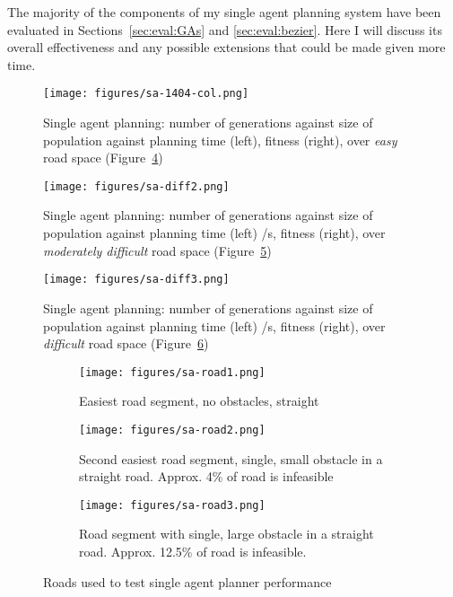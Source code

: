 The majority of the components of my single agent planning system have been evaluated in Sections~\ref{sec:eval:GAs} and \ref{sec:eval:bezier}. Here I will discuss its overall effectiveness and any possible extensions that could be made given more time.


\begin{figure}[ht]
  \centering
  \texttt{[image: figures/sa-1404-col.png]}
  \caption{\label{fig:sa-col} Single agent planning: number of generations against size of population against planning time (left), fitness (right), over \textit{easy} road space (Figure~\ref{subfig:sa-road1}) }
\end{figure}

\begin{figure}[ht]
  \centering
  \texttt{[image: figures/sa-diff2.png]}
  \caption{\label{fig:sa-diff2} Single agent planning: number of generations against size of population against planning time (left) /s, fitness (right), over \textit{moderately difficult} road space (Figure~\ref{subfig:sa-road2}) }
\end{figure}

\begin{figure}[ht]
  \centering
  \texttt{[image: figures/sa-diff3.png]}
  \caption{\label{fig:sa-diff3} Single agent planning: number of generations against size of population against planning time (left) /s, fitness (right), over \textit{difficult} road space (Figure~\ref{subfig:sa-road3}) }
\end{figure}

\begin{figure}
  \centering
  \begin{subfigure}[b]{0.44\textwidth}
    \centering
    \texttt{[image: figures/sa-road1.png]}
    \caption{\label{subfig:sa-road1}Easiest road segment, no obstacles, straight}
  \end{subfigure}
  \begin{subfigure}[b]{0.44\textwidth}
    \centering
    \texttt{[image: figures/sa-road2.png]}
    \caption{\label{subfig:sa-road2}Second easiest road segment, single, small obstacle in a straight road. Approx. 4\% of road is infeasible}
  \end{subfigure}
  \begin{subfigure}[b]{0.44\textwidth}
    \centering
    \texttt{[image: figures/sa-road3.png]}
    \caption{\label{subfig:sa-road3}Road segment with single, large obstacle in a straight road. Approx. 12.5\% of road is infeasible.}
  \end{subfigure}
  \caption{\label{fig:single-agent-roads} Roads used to test single agent planner performance}
\end{figure}

